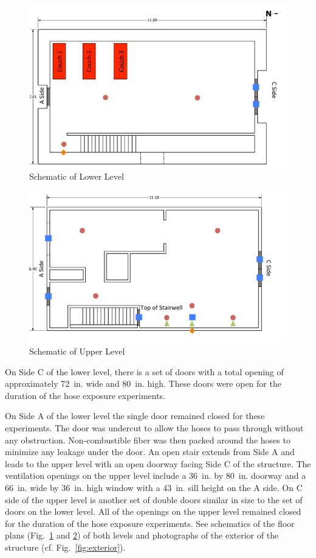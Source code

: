 \documentclass[letterpaper,11pt]{texMemo} %
\begin{document}
\begin{figure}[!ht]
\centering
\includegraphics[width=0.8\columnwidth]{../Figures/Hose_Figures/schematic_lower}
\caption{Schematic of Lower Level}
\label{fig:schematic_low}
\end{figure}

\begin{figure}[!ht]
\centering
\includegraphics[width=0.8\columnwidth]{../Figures/Hose_Figures/schematic_upper}
\caption{Schematic of Upper Level}
\label{fig:schematic_up}
\end{figure}

On Side C of the lower level, there is a set of doors with a total opening of approximately 72~in. wide and 80~in. high. These doors were open for the duration of the hose exposure experiments.  

On Side A of the lower level the single door remained closed for these experiments. The door was undercut to allow the hoses to pass through without any obstruction. Non-combustible fiber was then packed around the hoses to minimize any leakage under the door.  An open stair extends from Side A and leads to the upper level with an open doorway facing Side C of the structure. The ventilation openings on the upper level include a 36~in. by 80~in. doorway and a 66~in. wide by 36~in. high window with a 43~in. sill height on the A side. On C side of the upper level is another set of double doors similar in size to the set of doors on the lower level. All of the openings on the upper level remained closed for the duration of the hose exposure experiments. See schematics of the floor plans (Fig.~\ref{fig:schematic_low} and \ref{fig:schematic_up}) of both levels and photographs of the exterior of the structure (cf. Fig.~\ref{fig:exterior}).
\end{document}
